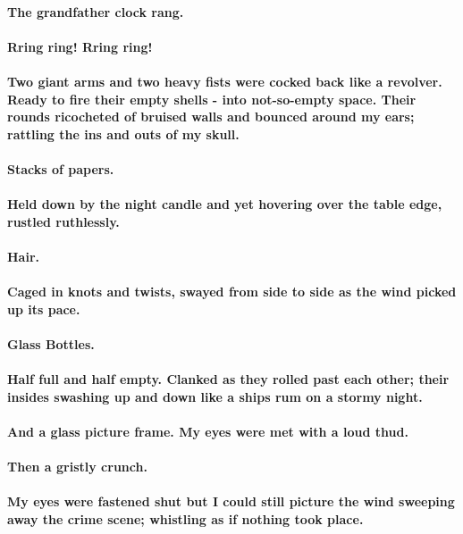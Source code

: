 \documentclass{book}
\begin{document}
\paragraph{The grandfather clock rang.\\\\
    Rring ring! Rring ring!\\\\
    Two giant arms and two heavy fists were cocked back like a revolver.
    Ready to fire their empty shells - into not-so-empty space.
    Their rounds ricocheted of bruised walls and bounced around my ears; rattling the ins and outs of my skull.\\\\
    Stacks of papers.\\\\
    Held down by the night candle and yet hovering over the table edge, rustled ruthlessly.\\\\
    Hair.\\\\
    Caged in knots and twists, swayed from side to side as the wind picked up its pace.\\\\
    Glass Bottles.\\\\
    Half full and half empty. Clanked as they rolled past each other; their insides swashing up and down like a ships rum on a stormy night.\\\\
    And a glass picture frame.
    My eyes were met with a loud thud.\\\\
    Then a gristly crunch.\\\\
    My eyes were fastened shut but I could still picture the wind sweeping away the crime scene; whistling as if nothing took place.
}
\end{document}
